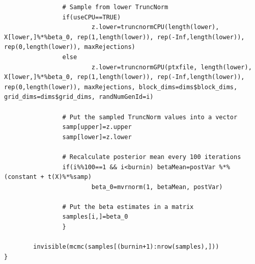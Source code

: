 \documentclass{article}
\begin{document}
\begin{verbatim}
                # Sample from lower TruncNorm                                   
                if(useCPU==TRUE)                                                
                        z.lower=truncnormCPU(length(lower), X[lower,]%*%beta_0, rep(1,length(lower)), rep(-Inf,length(lower)), rep(0,length(lower)), maxRejections)
                else                                                            
                        z.lower=truncnormGPU(ptxfile, length(lower), X[lower,]%*%beta_0, rep(1,length(lower)), rep(-Inf,length(lower)), rep(0,length(lower)), maxRejections, block_dims=dims$block_dims, grid_dims=dims$grid_dims, randNumGenId=i)
                                                                                
                # Put the sampled TruncNorm values into a vector                
                samp[upper]=z.upper                                             
                samp[lower]=z.lower                                             
                                                                                
                # Recalculate posterior mean every 100 iterations               
                if(i%%100==1 && i<burnin) betaMean=postVar %*% (constant + t(X)%*%samp)
                        beta_0=mvrnorm(1, betaMean, postVar)                    
                                                                                
                # Put the beta estimates in a matrix                            
                samples[i,]=beta_0                                              
                }                                                               
                                                                                
        invisible(mcmc(samples[(burnin+1):nrow(samples),]))                     
}
\end{verbatim}
\end{document}
